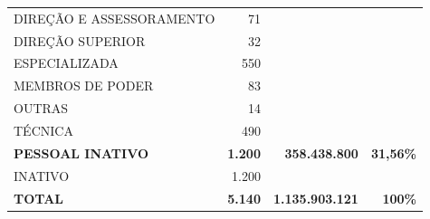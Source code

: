 \documentclass{article}
\begin{document}
\begin{longtable}[c]{m{7cm}|m{2.5cm}|m{2.5cm}|m{2.5cm}}
\multicolumn{1}{L{7cm}|}{ \hspace{3em} DIREÇÃO E ASSESSORAMENTO} & \multicolumn{1}{r|}{    71} &  & \\
\multicolumn{1}{L{7cm}|}{ \hspace{3em} DIREÇÃO SUPERIOR} & \multicolumn{1}{r|}{    32} &  & \\
\multicolumn{1}{L{7cm}|}{ \hspace{3em} ESPECIALIZADA} & \multicolumn{1}{r|}{   550} &  & \\
\multicolumn{1}{L{7cm}|}{ \hspace{3em} MEMBROS DE PODER} & \multicolumn{1}{r|}{    83} &  & \\
\multicolumn{1}{L{7cm}|}{ \hspace{3em} OUTRAS} & \multicolumn{1}{r|}{    14} &  & \\
\multicolumn{1}{L{7cm}|}{ \hspace{3em} TÉCNICA} & \multicolumn{1}{r|}{   490} &  & \\
\multicolumn{1}{L{7cm}|}{ \textbf{PESSOAL INATIVO}} & \multicolumn{1}{r|}{ \textbf{1.200}} & \multicolumn{1}{r|}{ \textbf{  358.438.800}} & \multicolumn{1}{r}{ \textbf{31,56\%}} \\
\multicolumn{1}{L{7cm}|}{ \hspace{3em} INATIVO} & \multicolumn{1}{r|}{ 1.200} &  & \\
\hline \hline 
\multicolumn{1}{L{7cm}|}{ \textbf{TOTAL}} & \multicolumn{1}{r|}{ \textbf{5.140}} & \multicolumn{1}{r|}{ \textbf{1.135.903.121}} & \multicolumn{1}{r}{ \textbf{100\%}} \\
\end{longtable}
\newpage
\small
\end{document}
